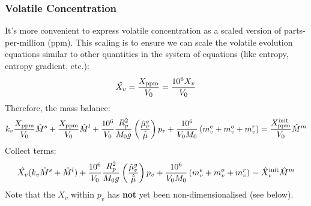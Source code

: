 \subsubsection{Volatile Concentration}
It's more convenient to express volatile concentration as a scaled version of parts-per-million (ppm).  This scaling is to ensure we can scale the volatile evolution equations similar to other quantities in the system of equations (like entropy, entropy gradient, etc.):
\begin{equation}
\hat{X_v} = \frac{X_{\rm ppm}}{V_0} = \frac{10^6 X_v}{V_0}
\end{equation}
Therefore, the mass balance:
\begin{equation}
k_v \frac{X_{\rm ppm}}{V_0} \hat{M}^s + \frac{X_{\rm ppm}}{V_0} \hat{M}^l + \frac{10^6}{V_0} \frac{R_p^2}{M_0 g} \left( \frac{\hat{\mu}_v^g}{\hat{\bar{\mu}}} \right) p_v + \frac{10^6}{V_0 M_0} \left( m_v^e + m_v^o + m_v^r \right) = \frac{X_{\rm ppm}^{\rm init}}{V_0} \hat{M}^m
\end{equation}
Collect terms:
\begin{equation}
\hat{X_v} (k_v \hat{M}^s + \hat{M}^l) + \frac{10^6}{V_0}\frac{R_p^2}{M_0 g} \left( \frac{\hat{\mu}_v^g}{\hat{\bar{\mu}}} \right) p_v + \frac{10^6}{V_0 M_0} \left( m_v^e + m_v^o + m_v^r \right) = \hat{X}_v^{\rm init} \hat{M}^m
\end{equation}
Note that the $X_v$ within $p_v$ has \textbf{not} yet been non-dimensionalised (see below).
